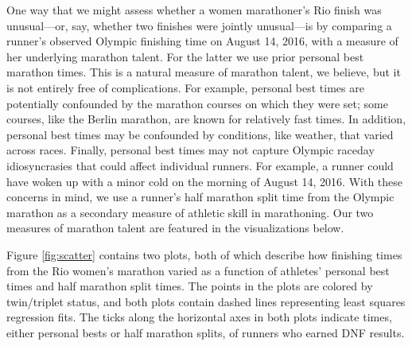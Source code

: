 \documentclass[12pt,titlepage]{article}
\begin{document}
One way that we might assess whether a women marathoner's Rio finish
was unusual---or, say, whether two finishes were jointly unusual---is
by comparing a runner's observed Olympic finishing time on August 14,
2016, with a measure of her underlying marathon talent.  For the
latter we use prior personal best marathon times.  This is a natural
measure of marathon talent, we believe, but it is not entirely free of
complications.  For example, personal best times are potentially
confounded by the marathon courses on which they were set; some
courses, like the Berlin marathon, are known for relatively fast
times.  In addition, personal best times may be confounded by
conditions, like weather, that varied across races.  Finally, personal
best times may not capture Olympic raceday idiosyncrasies that could
affect individual runners.  For example, a runner could have woken up
with a minor cold on the morning of August 14, 2016.  With these
concerns in mind, we use a runner's half marathon split time from the
Olympic marathon as a secondary measure of athletic skill in
marathoning.  Our two measures of marathon talent are featured in the
visualizations below.

Figure \ref{fig:scatter} contains two plots, both of which describe
how finishing times from the Rio women's marathon varied as a function
of athletes' personal best times and half marathon split times.  The
points in the plots are colored by twin/triplet status, and both plots
contain %
dashed lines representing least squares regression fits.  The ticks
along the horizontal axes in both plots indicate times, either
personal bests or half marathon splits, of runners who earned DNF
results.\label{scatterplots}
\end{document}

